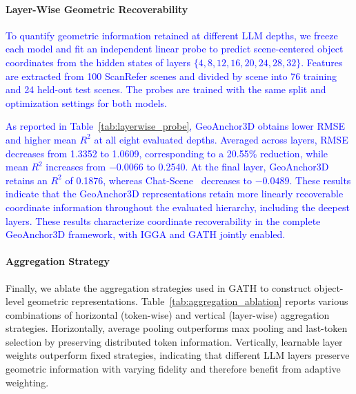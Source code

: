 \documentclass[lettersize,journal]{IEEEtran}
\begin{document}
\paragraph*{Layer-Wise Geometric Recoverability}
\textcolor{blue}{To quantify geometric information retained at different LLM depths, we freeze each model and fit an independent linear probe to predict scene-centered object coordinates from the hidden states of layers $\{4,8,12,16,20,24,28,32\}$. Features are extracted from 100 ScanRefer scenes and divided by scene into 76 training and 24 held-out test scenes. The probes are trained with the same split and optimization settings for both models.}

\textcolor{blue}{As reported in Table~\ref{tab:layerwise_probe}, GeoAnchor3D obtains lower RMSE and higher mean $R^2$ at all eight evaluated depths. Averaged across layers, RMSE decreases from 1.3352 to 1.0609, corresponding to a 20.55\% reduction, while mean $R^2$ increases from $-0.0066$ to 0.2540. At the final layer, GeoAnchor3D retains an $R^2$ of 0.1876, whereas Chat-Scene~\cite{chatscene2024} decreases to $-0.0489$. These results indicate that the GeoAnchor3D representations retain more linearly recoverable coordinate information throughout the evaluated hierarchy, including the deepest layers. These results characterize coordinate recoverability in the complete GeoAnchor3D framework, with IGGA and GATH jointly enabled.}


\paragraph*{Aggregation Strategy} Finally, we ablate the aggregation strategies used in GATH to construct object-level geometric representations. Table~\ref{tab:aggregation_ablation} reports various combinations of horizontal (token-wise) and vertical (layer-wise) aggregation strategies. Horizontally, average pooling outperforms max pooling and last-token selection by preserving distributed token information. Vertically, learnable layer weights outperform fixed strategies, indicating that different LLM layers preserve geometric information with varying fidelity and therefore benefit from adaptive weighting.
\end{document}
